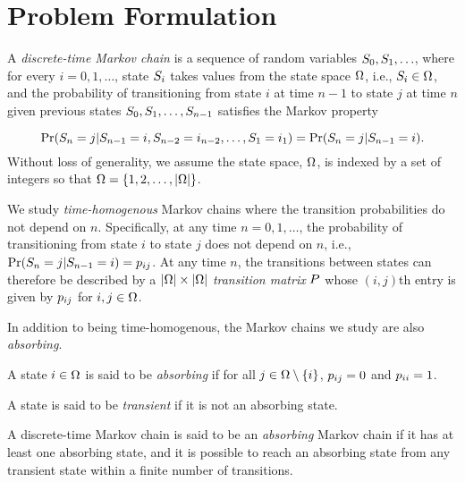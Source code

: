 \section{Problem Formulation}

A \emph{discrete-time Markov chain} is a sequence of random variables $S_{0}, S_{1}, \ldots $, where for every $i = 0, 1, \ldots$, state $S_{i}$ takes values from the state space $\Omega$, i.e., $S_{i} \in \Omega$, and the probability of transitioning from state $i$ at time $n-1$ to state $j$ at time $n$ given previous states $S_{0}, S_{1}, \ldots, S_{n-1}$ satisfies the Markov property 

\begin{equation}
	\operatorname{Pr}(S_{n} = j | S_{n-1} = i, S_{n- 2} = i_{n-2}, \ldots, S_{1} = i_{1}) = \operatorname{Pr}(S_{n} = j | S_{n-1} = i).
\end{equation}
%
Without loss of generality, we assume the state space, $\Omega$, is indexed by a set of integers so that $\Omega = \{1, 2, \ldots, |\Omega|\}$.

We study \emph{time-homogenous} Markov chains where the transition probabilities do not depend on $n$.  Specifically, at any time $n = 0, 1, \ldots$, the probability of transitioning from state $i$ to state $j$ does not depend on $n$, i.e., $\operatorname{Pr}(S_{n} = j | S_{n-1} = i) = p_{ij}$.  At any time $n$, the transitions between states can therefore be described by a $|\Omega| \times |\Omega|$ \emph{transition matrix} $P$ whose $(i, j)$th entry is given by $p_{ij}$ for $i, j \in \Omega$.

In addition to being time-homogenous, the Markov chains we study are also \emph{absorbing}.

\begin{mydef}
	A state $i \in \Omega$ is said to be \emph{absorbing} if for all $j \in \Omega \setminus \{i\}$, $p_{ij} = 0$  and $p_{ii} = 1$.
\end{mydef}

\begin{mydef}
	A state is said to be \emph{transient} if it is not an absorbing state.
\end{mydef}

\begin{mydef}
	A discrete-time Markov chain is said to be an \emph{absorbing} Markov chain if it has at least one absorbing state, and it is possible to reach an absorbing state from any transient state within a finite number of transitions.
\end{mydef}

